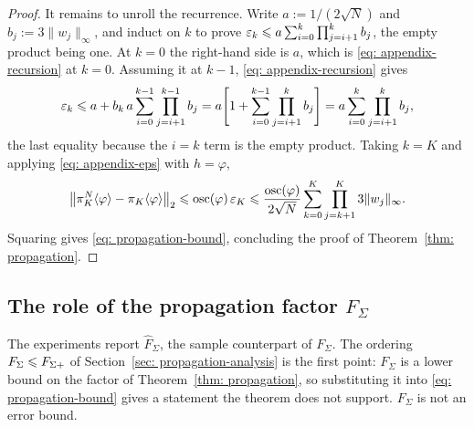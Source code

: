 \documentclass{article}
\begin{document}
\begin{proof}
It remains to unroll the recurrence. Write $a:=1/(2\sqrt N)$ and $b_j:=3\lVert w_j\rVert_\infty$, and induct on $k$ to prove $\varepsilon_k \leqslant a\sum_{i=0}^{k}\prod_{j=i+1}^{k}b_j$, the empty product being one. At $k=0$ the right-hand side is $a$, which is \eqref{eq: appendix-recursion} at $k=0$. Assuming it at $k-1$, \eqref{eq: appendix-recursion} gives
\begin{equation*}
    \varepsilon_k \leqslant a + b_k\,a\sum_{i=0}^{k-1}\prod_{j=i+1}^{k-1}b_j
    = a\Biggl[1+\sum_{i=0}^{k-1}\prod_{j=i+1}^{k}b_j\Biggr]
    = a\sum_{i=0}^{k}\prod_{j=i+1}^{k}b_j ,
\end{equation*}
the last equality because the $i=k$ term is the empty product. Taking $k=K$ and applying \eqref{eq: appendix-eps} with $h=\varphi$,
\begin{equation*}
    \bigl\lVert\pi_K^N\langle \varphi\rangle-\pi_K\langle \varphi\rangle\bigr\rVert_2
    \leqslant \operatorname{osc}(\varphi)\,\varepsilon_K
    \leqslant \frac{\operatorname{osc}(\varphi)}{2\sqrt N}\sum_{k=0}^{K}\prod_{j=k+1}^{K}3\lVert w_j\rVert_\infty .
\end{equation*}
Squaring gives \eqref{eq: propagation-bound}, concluding the proof of Theorem~\ref{thm: propagation}.
\end{proof}

\subsection{The role of the propagation factor \texorpdfstring{$F_\Sigma$}{F-Sigma}}
\label{subsec: appendix-factor}

The experiments report $\hat F_\Sigma$, the sample counterpart of $F_\Sigma$. The ordering $F_\Sigma\leqslant F_{\Sigma+}$ of Section~\ref{sec: propagation-analysis} is the first point: $F_\Sigma$ is a lower bound on the factor of Theorem~\ref{thm: propagation}, so substituting it into \eqref{eq: propagation-bound} gives a statement the theorem does not support. $F_\Sigma$ is not an error bound.
\end{document}
